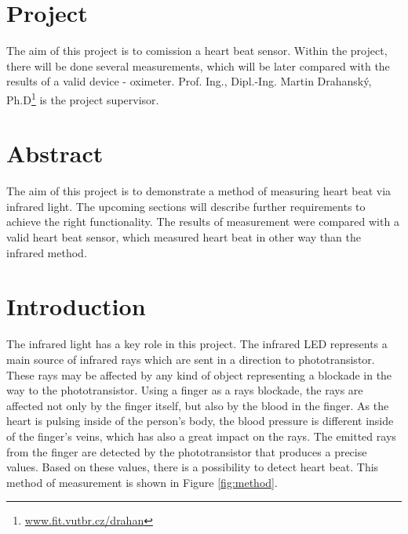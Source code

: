 \documentclass[11pt,a4paper]{article}
\newcommand{\tilda}{\raisebox{0.5ex}{\texttildelow}}
\begin{document}


\setlength{\parskip}{0pt}
\hypersetup{hidelinks}\tableofcontents
\setlength{\parskip}{0pt}

\newpage

\section{Project}

The aim of this project is to comission a heart beat sensor. Within the project, there will be done several measurements, which will be later compared with the results of a valid device - oximeter. Prof. Ing., Dipl.-Ing. Martin Drahanský, Ph.D\footnote{\href{http://www.fit.vutbr.cz/~drahan/}{www.fit.vutbr.cz/{\tilda}drahan}} is the project supervisor.

\section{Abstract}

The aim of this project is to demonstrate a method of measuring heart beat via infrared light. The upcoming sections will describe further requirements to achieve the right functionality. The results of measurement were compared with a valid heart beat sensor, which measured heart beat in other way than the infrared method.

\section{Introduction}\label{sec:intro}

The infrared light has a key role in this project. The infrared LED represents a main source of infrared rays which are sent in a direction to phototransistor. These rays may be affected by any kind of object representing a blockade in the way to the phototransistor. Using a finger as a rays blockade, the rays are affected not only by the finger itself, but also by the blood in the finger. As the heart is pulsing inside of the person's body, the blood pressure is different inside of the finger's veins, which has also a great impact on the rays. The emitted rays from the finger are detected by the phototransistor that produces a precise values. Based on these values, there is a possibility to detect heart beat. This method of measurement is shown in Figure \ref{fig:method}.
\end{document}
